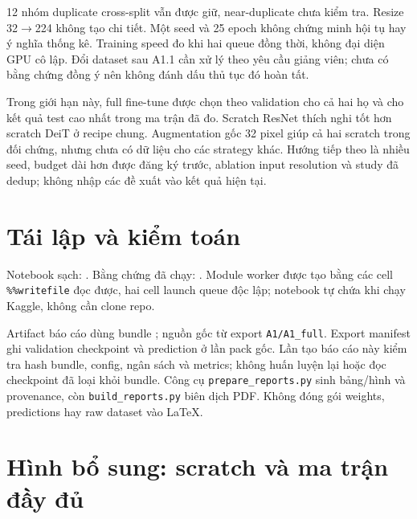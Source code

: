 \documentclass[11pt,a4paper]{article}
\begin{document}
12 nhóm duplicate cross-split vẫn được giữ, near-duplicate chưa kiểm tra. Resize 32$\to$224 không tạo chi tiết. Một seed và 25 epoch không chứng minh hội tụ hay ý nghĩa thống kê. Training speed đo khi hai queue đồng thời, không đại diện GPU cô lập. Đổi dataset sau A1.1 cần xử lý theo yêu cầu giảng viên; chưa có bằng chứng đồng ý nên không đánh dấu thủ tục đó hoàn tất.

Trong giới hạn này, full fine-tune được chọn theo validation cho cả hai họ và cho kết quả test cao nhất trong ma trận đã đo. Scratch ResNet thích nghi tốt hơn scratch DeiT ở recipe chung. Augmentation gốc 32 pixel giúp cả hai scratch trong đối chứng, nhưng chưa có dữ liệu cho các strategy khác. Hướng tiếp theo là nhiều seed, budget dài hơn được đăng ký trước, ablation input resolution và study đã dedup; không nhập các đề xuất vào kết quả hiện tại.

\section{Tái lập và kiểm toán}\label{sec:repro}
Notebook sạch: . Bằng chứng đã chạy: . Module worker được tạo bằng các cell \texttt{\%\%writefile} đọc được, hai cell launch queue độc lập; notebook tự chứa khi chạy Kaggle, không cần clone repo.

Artifact báo cáo dùng bundle ; nguồn gốc từ export \texttt{A1/A1\_full}. Export manifest ghi validation checkpoint và prediction ở lần pack gốc. Lần tạo báo cáo này kiểm tra hash bundle, config, ngân sách và metrics; không huấn luyện lại hoặc đọc checkpoint đã loại khỏi bundle. Công cụ \texttt{prepare\_reports.py} sinh bảng/hình và provenance, còn \texttt{build\_reports.py} biên dịch PDF. Không đóng gói weights, predictions hay raw dataset vào LaTeX.

\clearpage\appendix
\section{Hình bổ sung: scratch và ma trận đầy đủ}
\clearpage
{}
\end{document}

